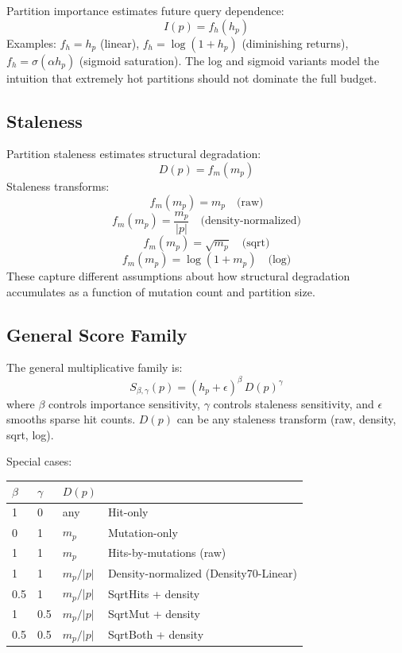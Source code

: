 \documentclass[sigconf, nonacm]{acmart}
\begin{document}
Partition importance estimates future query dependence:
\begin{equation}
  I(p) = f_h(h_p)
\end{equation}
Examples: $f_h = h_p$ (linear), $f_h = \log(1+h_p)$ (diminishing
returns), $f_h = \sigma(\alpha h_p)$ (sigmoid saturation). The log
and sigmoid variants model the intuition that extremely hot partitions
should not dominate the full budget.

\subsection{Staleness}

Partition staleness estimates structural degradation:
\begin{equation}
  D(p) = f_m(m_p)
\end{equation}
Staleness transforms:
\begin{equation}
  f_m(m_p) = m_p \quad \text{(raw)}
\end{equation}
\begin{equation}
  f_m(m_p) = \frac{m_p}{|p|} \quad \text{(density-normalized)}
\end{equation}
\begin{equation}
  f_m(m_p) = \sqrt{m_p} \quad \text{(sqrt)}
\end{equation}
\begin{equation}
  f_m(m_p) = \log(1+m_p) \quad \text{(log)}
\end{equation}
These capture different assumptions about how structural degradation
accumulates as a function of mutation count and partition size.

\subsection{General Score Family}

The general multiplicative family is:
\begin{equation}
  S_{\beta,\gamma}(p) = (h_p + \epsilon)^\beta\, D(p)^\gamma
  \label{eq:general}
\end{equation}
where $\beta$ controls importance sensitivity, $\gamma$ controls
staleness sensitivity, and $\epsilon$ smooths sparse hit counts.
$D(p)$ can be any staleness transform (raw, density, sqrt, log).

Special cases:
\begin{center}
\begin{tabular}{lll}
  \toprule
  $\beta$ & $\gamma$ & $D(p)$ \\  & 0 & any & Hit-only \\
  0 & 1 & $m_p$ & Mutation-only \\
  1 & 1 & $m_p$ & Hits-by-mutations (raw) \\
  1 & 1 & $m_p/|p|$ & Density-normalized (Density70-Linear) \\
  0.5 & 1 & $m_p/|p|$ & SqrtHits + density \\
  1 & 0.5 & $m_p/|p|$ & SqrtMut + density \\
  0.5 & 0.5 & $m_p/|p|$ & SqrtBoth + density \\
  \bottomrule
\end{tabular}
\end{center}
\end{document}
